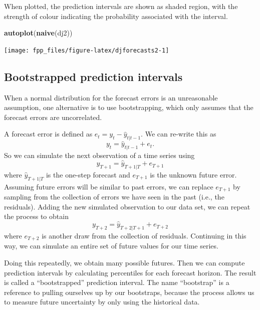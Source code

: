 \documentclass[]{book}
\newenvironment{Shaded}{\begin{snugshade}}{\end{snugshade}}
\newcommand{\KeywordTok}[1]{\textcolor[rgb]{0.13,0.29,0.53}{\textbf{#1}}}
\newcommand{\NormalTok}[1]{#1}
\begin{document}
When plotted, the prediction intervals are shown as shaded region, with the strength of colour indicating the probability associated with the interval.

\begin{Shaded}
\begin{Highlighting}[]
\KeywordTok{autoplot}\NormalTok{(}\KeywordTok{naive}\NormalTok{(dj2))}
\end{Highlighting}
\end{Shaded}

\begin{center}\texttt{[image: fpp\_files/figure-latex/djforecasts2-1]} \end{center}

\hypertarget{bootstrapped-prediction-intervals}{%
\subsection*{Bootstrapped prediction intervals}\label{bootstrapped-prediction-intervals}}

When a normal distribution for the forecast errors is an unreasonable assumption, one alternative is to use bootstrapping, which only assumes that the forecast errors are uncorrelated.

A forecast error is defined as \(e_t = y_t - \hat{y}_{t|t-1}\). We can re-write this as
\[
  y_t = \hat{y}_{t|t-1} + e_t.
\]
So we can simulate the next observation of a time series using
\[
  y_{T+1} = \hat{y}_{T+1|T} + e_{T+1}
\]
where \(\hat{y}_{T+1|T}\) is the one-step forecast and \(e_{T+1}\) is the unknown future error. Assuming future errors will be similar to past errors, we can replace \(e_{T+1}\) by sampling from the collection of errors we have seen in the past (i.e., the residuals). Adding the new simulated observation to our data set, we can repeat the process to obtain
\[
  y_{T+2} = \hat{y}_{T+2|T+1} + e_{T+2}
\]
where \(e_{T+2}\) is another draw from the collection of residuals. Continuing in this way, we can simulate an entire set of future values for our time series.

Doing this repeatedly, we obtain many possible futures. Then we can compute prediction intervals by calculating percentiles for each forecast horizon. The result is called a ``bootstrapped'' prediction interval. The name ``bootstrap'' is a reference to pulling ourselves up by our bootstraps, because the process allows us to measure future uncertainty by only using the historical data.
\end{document}
